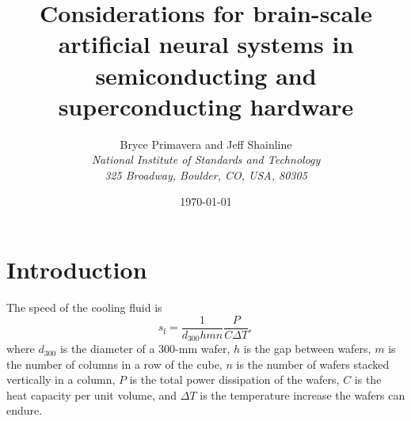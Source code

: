 \documentclass[onecolumn]{article}
\title{Considerations for brain-scale artificial neural systems in semiconducting and superconducting hardware}
\author[1]{\Large{Bryce Primavera and Jeff Shainline}
\\
\textit{\large{National Institute of Standards and Technology}}
\\
\vspace{-0.2em}
\textit{\large{325 Broadway, Boulder, CO, USA, 80305}}
\\
}
\date{\today}%
\begin{document}
\maketitle
\begin{abstract}
\vspace{3em}
\end{abstract}

	
\setcounter{tocdepth}{3}
\setcounter{secnumdepth}{4}
\tableofcontents	
	
\section{\label{sec:introduction}Introduction}

The speed of the cooling fluid is
\begin{equation}
s_{\mathrm{f}} = \frac{1}{d_{300}hmn}\frac{P}{C\Delta T},
\end{equation}
where $d_{300}$ is the diameter of a 300-mm wafer, $h$ is the gap between wafers, $m$ is the number of columns in a row of the cube, $n$ is the number of wafers stacked vertically in a column, $P$ is the total power dissipation of the wafers, $C$ is the heat capacity per unit volume, and $\Delta T$ is the temperature increase the wafers can endure.
\end{document}
